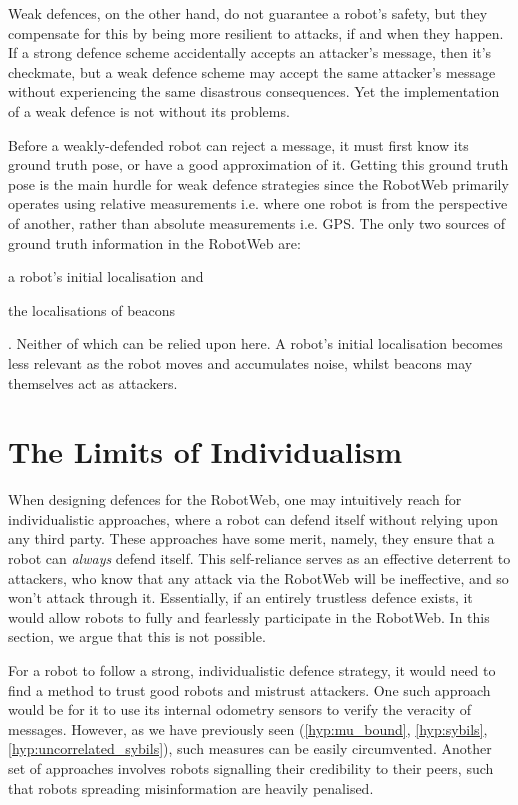 Weak defences, on the other hand, do not guarantee a robot's safety, but they compensate for this by being more resilient to attacks, if and when they happen. If a strong defence scheme accidentally accepts an attacker's message, then it's checkmate, but a weak defence scheme may accept the same attacker's message without experiencing the same disastrous consequences. Yet the implementation of a weak defence is not without its problems. 

Before a weakly-defended robot can reject a message, it must first know its ground truth pose, or have a good approximation of it. Getting this ground truth pose is the main hurdle for weak defence strategies since the RobotWeb primarily operates using relative measurements i.e. where one robot is from the perspective of another, rather than absolute measurements i.e. GPS. The only two sources of ground truth information in the RobotWeb are: \begin{enumerate*}
    \item a robot's initial localisation and
    \item the localisations of beacons
\end{enumerate*}. Neither of which can be relied upon here. A robot's initial localisation becomes less relevant as the robot moves and accumulates noise, whilst beacons may themselves act as attackers.

\section{The Limits of Individualism} \label{section:indiv-limits}
When designing defences for the RobotWeb, one may intuitively reach for individualistic approaches, where a robot can defend itself without relying upon any third party. These approaches have some merit, namely, they ensure that a robot can \textit{always} defend itself. This self-reliance serves as an effective deterrent to attackers, who know that any attack via the RobotWeb will be ineffective, and so won't attack through it. Essentially, if an entirely trustless defence exists, it would allow robots to fully and fearlessly participate in the RobotWeb. In this section, we argue that this is not possible.

For a robot to follow a strong, individualistic defence strategy, it would need to find a method to trust good robots and mistrust attackers. One such approach would be for it to use its internal odometry sensors to verify the veracity of messages. However, as we have previously seen (\ref{hyp:mu_bound}, \ref{hyp:sybils}, \ref{hyp:uncorrelated_sybils}), such measures can be easily circumvented. Another set of approaches involves robots signalling their credibility to their peers, such that robots spreading misinformation are heavily penalised.

